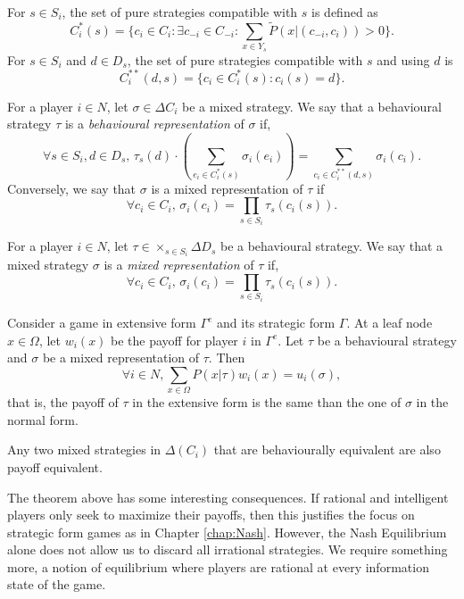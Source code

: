 \begin{definition}
For $s \in S_i$,  the set of pure strategies compatible with $s$ is defined as
$$ C_i^*(s) = \{c_i \in C_i : \exists c_{-i} \in C_{-i} : \sum_{x \in Y_s} \tilde P(x | (c_{-i}, c_i)) > 0\}.$$
For $s \in S_i$ and $d \in D_s$, the set of pure strategies compatible with $s$ and using $d$ is
$$ C_i^{**}(d,s) = \{c_i \in C_i^*(s) : c_i(s) = d\}. $$
\end{definition}

\begin{definition}
For a player $i \in N$, let $\sigma \in \Delta C_i$ be a mixed strategy.
We say that a behavioural strategy $\tau$ is a \emph{behavioural representation} of $\sigma$ if,
$$ \forall s \in S_i, d \in D_s, \, \tau_s(d)\cdot\left ( \sum_{e_i \in C_i^*(s)} \sigma_i(e_i) \right ) = \sum_{c_i \in C_i^{**}(d,s)} \sigma_i(c_i). $$
Conversely, we say that $\sigma$ is a mixed representation of $\tau$ if
$$\forall c_i \in C_i, \, \sigma_i(c_i) = \prod_{s \in S_i} \tau_s(c_i(s)).$$
\end{definition}

\begin{definition}
For a player $i \in N$, let $\tau \in \times_{s \in S_i} \Delta  D_s$ be a behavioural strategy.
We say that a mixed strategy $\sigma$ is a \emph{mixed representation} of $\tau$ if,
$$\forall c_i \in C_i, \, \sigma_i(c_i) = \prod_{s \in S_i} \tau_s(c_i(s)).$$
\end{definition}

\begin{proposition}
Consider a game in extensive form $\Gamma^e$ and its strategic form $\Gamma$.
At a leaf node $x \in \Omega$, let $w_i(x)$ be the payoff for player $i$ in $\Gamma^e$.
Let $\tau$ be a behavioural strategy and $\sigma$ be a mixed representation of $\tau$.
Then
$$ \forall i \in N, \sum_{x \in \Omega} P(x | \tau) w_i(x) = u_i(\sigma),$$
that is, the payoff of $\tau$ in the extensive form is the same than the one of $\sigma$ in the normal form.
\end{proposition}

\begin{theorem}[Kuhn]
Any two mixed strategies in $\Delta(C_i)$ that are behaviourally equivalent are also payoff equivalent.
\end{theorem}

The theorem above has some interesting consequences. If rational and intelligent players only seek to maximize their payoffs, then this justifies the focus on strategic form games as in Chapter \ref{chap:Nash}. However, the Nash Equilibrium alone does not allow us to discard all irrational strategies. We require something more, a notion of equilibrium where players are rational at every information state of the game.

